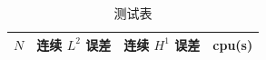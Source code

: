 ﻿\documentclass{ctexart}
\begin{document}
\begin{table}[h]
\centering
\begin{tabular}{r r r r}
\toprule
$N$ & 连续 $L^2$ 误差 & 连续 $H^1$ 误差 & cpu(s) \\
\midrule

\bottomrule
\end{tabular}
\caption{测试表}
\end{table}
\end{document}
